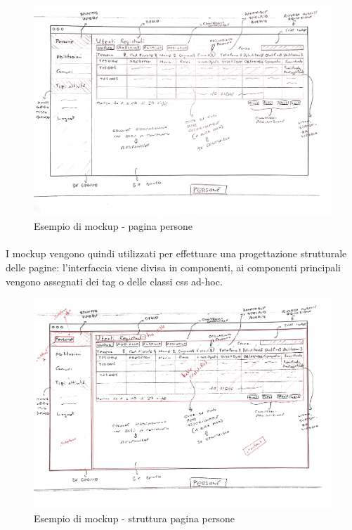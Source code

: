 \documentclass[12pt,a4paper,twoside,english,italian]{book}
\begin{document}
\begin{figure}[H]
    \centering
    \includegraphics[width=1\textwidth]{img/mockup_web_persone.pdf}
    \caption{Esempio di mockup - pagina persone}
\end{figure}

\paragraph{} I mockup vengono quindi utilizzati per effettuare una progettazione strutturale delle pagine: l'interfaccia viene divisa in componenti, ai componenti principali vengono assegnati dei tag o delle classi css ad-hoc.

\begin{figure}[H]
    \centering
    \includegraphics[width=1\textwidth]{img/mockup_web_persone_2.pdf}
    \caption{Esempio di mockup - struttura pagina persone}
\end{figure}
\end{document}
